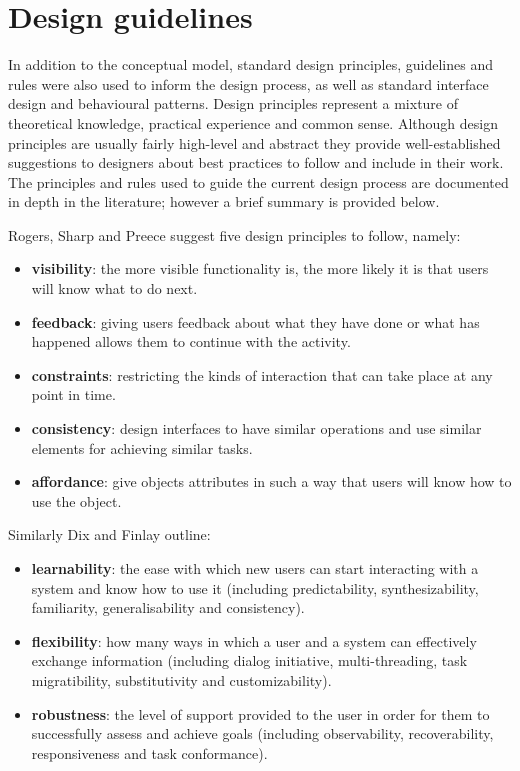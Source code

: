 \section{Design guidelines}
In addition to the conceptual model, standard design principles, guidelines and rules were also used to inform the design process, as well as standard interface design and behavioural patterns. Design principles represent a mixture of theoretical knowledge, practical experience and common sense\citep[p. 26]{RogersPreece}. Although design principles are usually fairly high-level and abstract they provide well-established suggestions to designers about best practices to follow and include in their work. The principles and rules used to guide the current design process are documented in depth in the literature; however a brief summary is provided below.

Rogers, Sharp and Preece\citep[p. 26-29]{RogersPreece} suggest five design principles to follow, namely:
\begin{itemize}
 \item  \textbf{visibility}: the more visible functionality is, the more likely it is that users will know what to do next.
\item \textbf{feedback}: giving users feedback about what they have done or what has happened allows them to continue with the activity.
\item \textbf{constraints}: restricting the kinds of interaction that can take place at any point in time.
\item \textbf{consistency}: design interfaces to have similar operations and use similar elements for achieving similar tasks.
\item \textbf{affordance}: give objects attributes in such a way that users will know how to use the object.
\end{itemize}
Similarly Dix and Finlay\citep[p. 260]{DixFinlay} outline: 
\begin{itemize}
 \item \textbf{learnability}: the ease with which new users can start interacting with a system and know how to use it (including predictability, synthesizability, familiarity, generalisability and consistency). 
 \item  \textbf{flexibility}: how many ways in which a user and a system can effectively exchange information (including dialog initiative, multi-threading, task migratibility, substitutivity and customizability).
 \item  \textbf{robustness}: the level of support provided to the user in order for them to successfully assess and achieve goals (including observability, recoverability, responsiveness and task conformance). 
\end{itemize}

